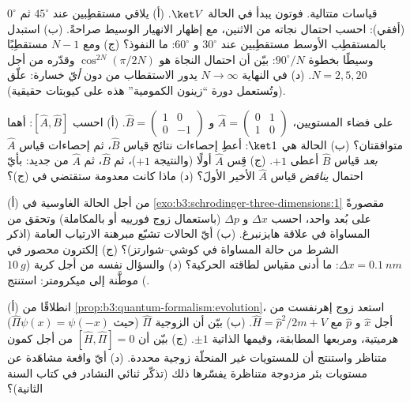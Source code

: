 \begin{exercise}[$\star\star$]\label{exo:b3:quantum-formalism:5}
قياسات متتالية. فوتون يبدأ في الحالة $\ket V$. (أ) يلاقي
مستقطِبين عند $45^\circ$ ثم $0^\circ$ (أفقي): احسب
احتمال نجاته من الاثنين، مع إظهار الانهيار الوسيط
صراحةً. (ب) استبدل بالمستقطِب الأوسط مستقطِبين عند $30^\circ$ و
$60^\circ$: ما النفوذ؟ (ج) ومع $N - 1$ مستقطِبًا وسيطًا
بخطوة $90^\circ/N$: بيّن أن احتمال النجاة هو
$\cos^{2N}(\pi/2N)$ وقدّره من أجل $N = 2, 5, 20$. (د) في النهاية
$N \to \infty$ يدور الاستقطاب من دون \emph{أيّ} خسارة:
علّق (وتُستعمل دورة ``زينون الكمومية'' هذه على كيوبتات حقيقية).
\end{exercise}

\begin{exercise}[$\star\star$]\label{exo:b3:quantum-formalism:6}
على فضاء المستويين، $\hat A = \begin{pmatrix}0&1\\1&0
\end{pmatrix}$ و $\hat B = \begin{pmatrix}1&0\\0&-1\end{pmatrix}$.
(أ) احسب $[\hat A, \hat B]$: أهما متوافقتان؟ (ب) الحالة هي
$\ket1$: أعطِ إحصاءات نتائج قياس $\hat B$، ثم
إحصاءات قياس $\hat A$ \emph{بعد} قياس $\hat B$ أعطى $+1$.
(ج) قِس $\hat A$ أولًا (والنتيجة $+1$)، ثم $\hat B$، ثم
$\hat A$ من جديد: بأيّ احتمال \emph{يناقض} قياس $\hat A$
الأخير الأولَ؟ (د) ماذا كانت  معدومة ستقتضي في (ج)؟
\end{exercise}

\begin{exercise}[$\star\star$]\label{exo:b3:quantum-formalism:7}
(أ) من أجل الحالة الغاوسية في
\cref{exo:b3:schrodinger-three-dimensions:1} مقصورةً على بُعد
واحد، احسب $\Delta x$ و $\Delta p$ (باستعمال زوج فورييه أو
بالمكاملة) وتحقق من المساواة في علاقة هايزنبرغ. (ب) أيّ
الحالات تشبّع مبرهنة الارتياب العامة (اذكر الشرط
من حالة المساواة في كوشي--شوارتز)؟ (ج) إلكترون محصور في
$\Delta x = \qty{0.1}{nm}$: ما أدنى مقياس لطاقته الحركية؟ (د) والسؤال نفسه
من أجل كرية ($\qty{10}{g}$) موطَّنة إلى ميكرومتر: استنتج.
\end{exercise}

\begin{exercise}[$\star\star$]\label{exo:b3:quantum-formalism:8}
(أ) انطلاقًا من \cref{prop:b3:quantum-formalism:evolution}، استعد
زوج إهرنفست من أجل $\hat x$ و $\hat p$ مع $\hat H = \hat
p^2/2m + V$. (ب) بيّن أن الزوجية $\hat\Pi$ (حيث $\hat\Pi\psi(x) =
\psi(-x)$) هرميتية، ومربعها المطابقة، وقيمها
الذاتية $\pm1$. (ج) بيّن أن $[\hat H, \hat\Pi] = 0$ من أجل كمون
متناظر واستنتج أن للمستويات غير المنحلّة زوجية
محددة. (د) أيّ واقعة مشاهَدة عن مستويات بئر مزدوجة
متناظرة يفسّرها ذلك (تذكّر ثنائي النشادر في كتاب
السنة الثانية)؟
\end{exercise}

